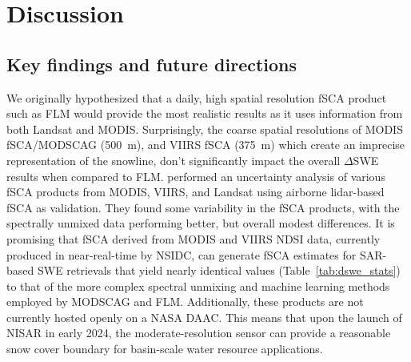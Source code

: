 \hypertarget{ch5-discussion}{\section{Discussion}\label{ch4-discussion}}
\hypertarget{ch5-discussion-1}{\subsection{Key findings and future directions}\label{ch4-discussion}}

We originally hypothesized that a daily, high spatial resolution fSCA product such as FLM would provide the most realistic results as it uses information from both Landsat and MODIS. Surprisingly, the coarse spatial resolutions of MODIS fSCA/MODSCAG (500~m), and VIIRS fSCA (375~m) which create an imprecise representation of the snowline, don't significantly impact the overall $\Delta$SWE results when compared to FLM. \cite{stillingerLandsatMODISVIIRS2023} performed an uncertainty analysis of various fSCA products from MODIS, VIIRS, and Landsat using airborne lidar-based fSCA as validation. They found some variability in the fSCA products, with the spectrally unmixed data performing better, but overall modest differences. It is promising that fSCA derived from MODIS and VIIRS NDSI data, currently produced in near-real-time by NSIDC, can generate fSCA estimates for SAR-based SWE retrievals that yield nearly identical values (Table~\ref{tab:dswe_stats}) to that of the more complex spectral unmixing and machine learning methods employed by MODSCAG and FLM. Additionally, these products are not currently hosted openly on a NASA DAAC. This means that upon the launch of NISAR in early 2024, the moderate-resolution sensor can provide a reasonable snow cover boundary for basin-scale water resource applications. 


